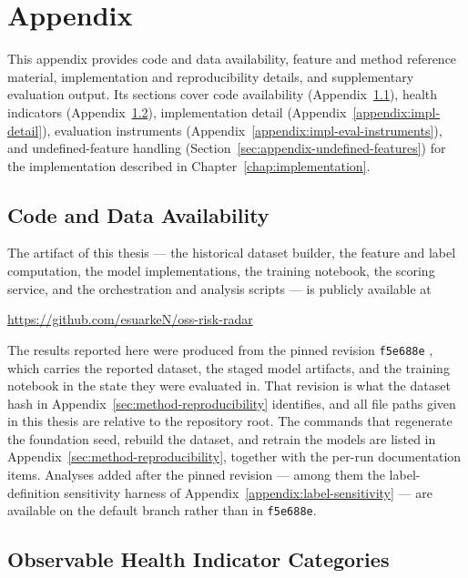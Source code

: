 \chapter{Appendix}

This appendix provides code and data availability, feature and method reference
material, implementation and reproducibility details, and supplementary
evaluation output. Its sections cover code availability
(Appendix~\ref{appendix:code-availability}), health indicators
(Appendix~\ref{appendix:health-indicators}), implementation detail
(Appendix~\ref{appendix:impl-detail}), evaluation instruments
(Appendix~\ref{appendix:impl-eval-instruments}), and undefined-feature handling
(Section~\ref{sec:appendix-undefined-features}) for the implementation described
in Chapter~\ref{chap:implementation}.

\section{Code and Data Availability}
\label{appendix:code-availability}

The artifact of this thesis --- the historical dataset builder, the feature and label
computation, the model implementations, the training notebook, the scoring service, and
the orchestration and analysis scripts --- is publicly available at

\begin{center}
\url{https://github.com/esuarkeN/oss-risk-radar}
\end{center}

\noindent The results reported here were produced from the pinned revision
\texttt{f5e688e} \cite{ossRiskRadarReadme}, which carries the reported dataset, the
staged model artifacts, and the training notebook in the state they were evaluated in.
That revision is what the dataset hash in Appendix~\ref{sec:method-reproducibility}
identifies, and all file paths given in this thesis are relative to the repository root.
The commands that regenerate the foundation seed, rebuild the dataset, and retrain the
models are listed in Appendix~\ref{sec:method-reproducibility}, together with the
per-run documentation items. Analyses added after the pinned revision --- among them the
label-definition sensitivity harness of Appendix~\ref{appendix:label-sensitivity} ---
are available on the default branch rather than in \texttt{f5e688e}.

\section{Observable Health Indicator Categories}
\label{appendix:health-indicators}

